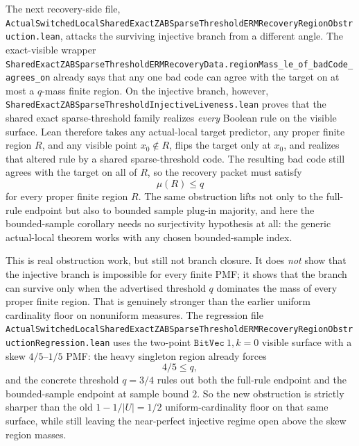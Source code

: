 \documentclass[11pt]{article}
\theoremstyle{remark}
\begin{document}
The next recovery-side file,
\texttt{ActualSwitchedLocalSharedExactZABSparseThresholdERMRecoveryRegionObstruction.lean},
attacks the surviving injective branch from a different angle.  The exact-visible
wrapper
\texttt{SharedExactZABSparseThresholdERMRecoveryData.regionMass\_le\_of\_badCode\_agrees\_on}
already says that any one bad code can agree with the target on at most a
\(q\)-mass finite region.  On the injective branch, however,
\texttt{SharedExactZABSparseThresholdInjectiveLiveness.lean} proves that the
shared exact sparse-threshold family realizes \emph{every} Boolean rule on the
visible surface.  Lean therefore takes any actual-local target predictor, any
proper finite region \(R\), and any visible point \(x_0 \notin R\), flips the
target only at \(x_0\), and realizes that altered rule by a shared sparse-threshold
code.  The resulting bad code still agrees with the target on all of \(R\), so
the recovery packet must satisfy
\[
  \mu(R) \le q
\]
for every proper finite region \(R\).  The same obstruction lifts not only to
the full-rule endpoint but also to bounded sample plug-in majority, and here
the bounded-sample corollary needs no surjectivity hypothesis at all: the generic
actual-local theorem works with any chosen bounded-sample index.

This is real obstruction work, but still not branch closure.  It does \emph{not}
show that the injective branch is impossible for every finite PMF; it shows that
the branch can survive only when the advertised threshold \(q\) dominates the
mass of every proper finite region.  That is genuinely stronger than the earlier
uniform cardinality floor on nonuniform measures.  The regression file
\texttt{ActualSwitchedLocalSharedExactZABSparseThresholdERMRecoveryRegionObstructionRegression.lean}
uses the two-point \(\texttt{BitVec}\ 1, k=0\) visible surface with a skew
\(4/5\)--\(1/5\) PMF: the heavy singleton region already forces
\[
  4/5 \le q,
\]
and the concrete threshold \(q = 3/4\) rules out both the full-rule endpoint
and the bounded-sample endpoint at sample bound \(2\).  So the new obstruction
is strictly sharper than the old \(1 - 1/|U| = 1/2\) uniform-cardinality floor
on that same surface, while still leaving the near-perfect injective regime
open above the skew region masses.
\end{document}
